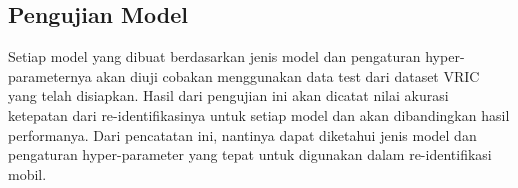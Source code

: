 \subsection{Pengujian Model}

Setiap model yang dibuat berdasarkan jenis model dan pengaturan hyper-parameternya akan diuji cobakan menggunakan data test 
dari dataset VRIC yang telah disiapkan. Hasil dari pengujian ini akan dicatat nilai akurasi ketepatan dari re-identifikasinya 
untuk setiap model dan akan dibandingkan hasil performanya. Dari pencatatan ini, nantinya dapat diketahui jenis model dan 
pengaturan hyper-parameter yang tepat untuk digunakan dalam re-identifikasi mobil.





% 

